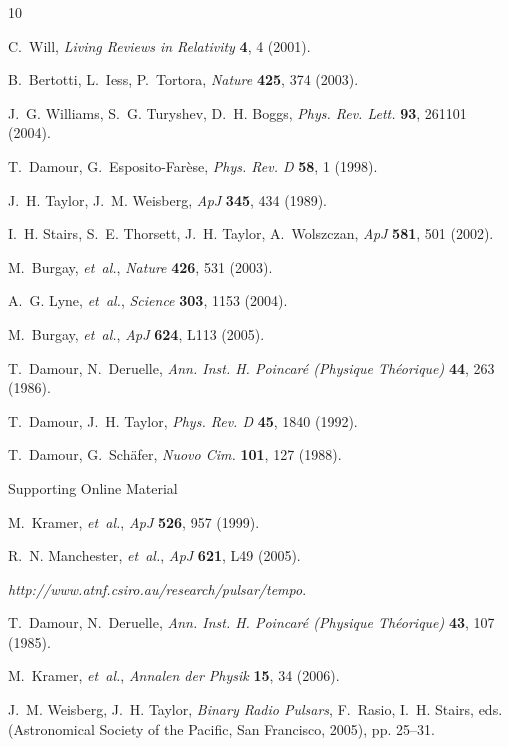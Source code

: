 \documentclass[12pt,psfig]{article}
\begin{document}
\begin{thebibliography}{10}

C.~{Will}, {\it Living Reviews in Relativity\/} {\bf 4}, 4 (2001).

B.~Bertotti, L.~Iess, P.~Tortora, {\it Nature\/} {\bf 425}, 374 (2003).

J.~G. Williams, S.~G. Turyshev, D.~H. Boggs, {\it Phys. Rev. Lett.\/} {\bf 93},
  261101 (2004).

T.~Damour, G.~{Esposito-Far{\` e}se}, {\it Phys. Rev. D\/} {\bf 58}, 1 (1998).

J.~H. Taylor, J.~M. Weisberg, {\it ApJ\/} {\bf 345}, 434 (1989).

I.~H. Stairs, S.~E. Thorsett, J.~H. Taylor, A.~Wolszczan, {\it ApJ\/} {\bf
  581}, 501 (2002).

M.~{Burgay}, {\it et~al.\/}, {\it Nature\/} {\bf 426}, 531 (2003).

A.~G. Lyne, {\it et~al.\/}, {\it Science\/} {\bf 303}, 1153 (2004).

M.~{Burgay}, {\it et~al.\/}, {\it ApJ\/} {\bf 624}, L113 (2005).

T.~Damour, N.~Deruelle, {\it Ann. Inst. H. Poincar\'e (Physique Th\'eorique)\/}
  {\bf 44}, 263 (1986).

T.~Damour, J.~H. Taylor, {\it Phys. Rev. D\/} {\bf 45}, 1840 (1992).

T.~Damour, G.~Sch{\"a}fer, {\it Nuovo Cim.\/} {\bf 101}, 127 (1988).

 Supporting Online Material

M.~Kramer, {\it et~al.\/}, {\it ApJ\/} {\bf 526}, 957 (1999).

R.~N. {Manchester}, {\it et~al.\/}, {\it ApJ\/} {\bf 621}, L49 (2005).

 {\it http://www.atnf.csiro.au/research/pulsar/tempo}.

T.~Damour, N.~Deruelle, {\it Ann. Inst. H. Poincar\'e (Physique Th\'eorique)\/}
  {\bf 43}, 107 (1985).

M.~Kramer, {\it et~al.\/}, {\it {Annalen der Physik}\/} {\bf 15}, 34 (2006).

J.~M. {Weisberg}, J.~H. {Taylor}, {\it {Binary Radio Pulsars}\/}, F.~Rasio,
  I.~H. Stairs, eds. (Astronomical Society of the Pacific, San Francisco,
  2005), pp. 25--31.


\end{thebibliography}
\end{document}
